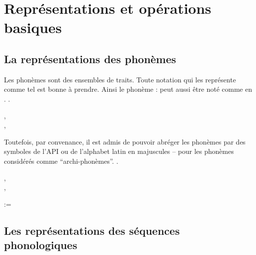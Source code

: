     \begin{comment}
	\begin{defin}[PHON-L]
		Pour toute langue L,  PHON-L est le plus petit ensemble contenant tous les traits phonologiques actifs dans L. Plus formellement PHON-L = $ \{ X : X \in PHON \land X\mbox{ est actif dans L}.\}$
	\end{defin}
	\end{comment}
	
	
  \section{Repr\'esentations et op\'erations basiques}
    \subsection{La repr\'esentations des phon\`emes}
      Les phon\`emes sont des ensembles de traits. Toute notation qui les repr\'esente comme tel est bonne \`a prendre. Ainsi le phon\`eme :  peut aussi \^etre not\'e comme en \Next.
      \ex. \begin{matrice}
      	,\\
      	,\\
      \end{matrice}
      
      Toutefois, par convenance, il est admis de pouvoir abr\'eger les phon\`emes par des symboles de l'API ou de l'alphabet latin en majuscules -- pour les phon\`emes consid\'er\'es comme ``archi-phon\`emes''.
      \ex. \begin{matrice}
      	,\\
      	,\\
      \end{matrice} :=\quad {}
         
    \subsection{Les repr\'esentations des s\'equences phonologiques}
